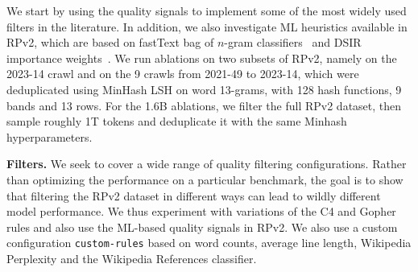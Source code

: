 \documentclass{article}
\begin{document}
\begin{table}[!tbp]
\centering
\caption{
Aggregated evaluations for the 1.6B parameter LM for different datasets. The Benchmark scores are aggregated from the benchmarks outlined in Table~\ref{tab:benchmarks}, using (1) the average accuracy, (2) the Rank-Score, and (3) the normalized average score.
}
\label{tab:agg-1_6b-scores}
\vspace{-1em}
\end{table}
We start by using the quality signals to implement some of the most widely used filters in the literature. In addition, we also investigate ML heuristics available in RPv2, which are based on fastText bag of $n$-gram classifiers~\cite{joulin2017bag} and DSIR importance weights~\cite{xie2023data}. We run ablations on two subsets of RPv2, namely on the 2023-14 crawl and on the 9 crawls from 2021-49 to 2023-14, which were deduplicated using MinHash LSH on word 13-grams, with 128 hash functions, 9 bands and 13 rows. For the 1.6B ablations, we filter the full RPv2 dataset, then sample roughly 1T tokens and deduplicate it with the same Minhash hyperparameters.

{\bf Filters.} 
We seek to cover a wide range of quality filtering configurations. Rather than optimizing the performance on a particular benchmark, the goal is to show that filtering the RPv2 dataset in different ways can lead to wildly different model performance. We thus experiment with variations of the C4 and Gopher rules and also use the ML-based quality signals in RPv2. We also use a custom configuration \texttt{custom-rules} based on word counts, average line length, Wikipedia Perplexity and the Wikipedia References classifier.
\end{document}
